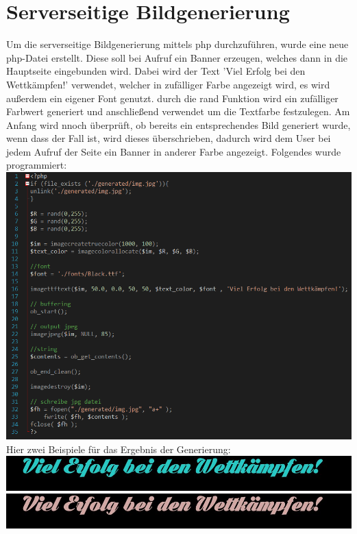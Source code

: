 \chapter{Serverseitige Bildgenerierung}
Um die serverseitige Bildgenerierung mittels php durchzuf\"uhren, wurde eine neue php-Datei erstellt. Diese soll bei Aufruf ein Banner erzeugen, welches dann in die Hauptseite eingebunden wird. Dabei wird der Text 'Viel Erfolg bei den Wettk\"ampfen!' verwendet, welcher in zuf\"alliger Farbe angezeigt wird, es wird außerdem ein eigener Font genutzt. durch die rand Funktion wird ein zuf\"alliger Farbwert generiert und anschließend verwendet um die Textfarbe festzulegen. Am Anfang wird nnoch \"uberpr\"uft, ob bereits ein entsprechendes Bild generiert wurde, wenn dass der Fall ist, wird dieses \"uberschrieben, dadurch wird dem User bei jedem Aufruf der Seite ein Banner in anderer Farbe angezeigt. Folgendes wurde programmiert:
\newline
\includegraphics[width=1\textwidth]{img/vincent/abb10.png}
\newline
Hier zwei Beispiele f\"ur das Ergebnis der Generierung:
\newline
\includegraphics[width=1\textwidth]{img/vincent/img.jpg}
\includegraphics[width=1\textwidth]{img/vincent/img2.jpg}
\newline
